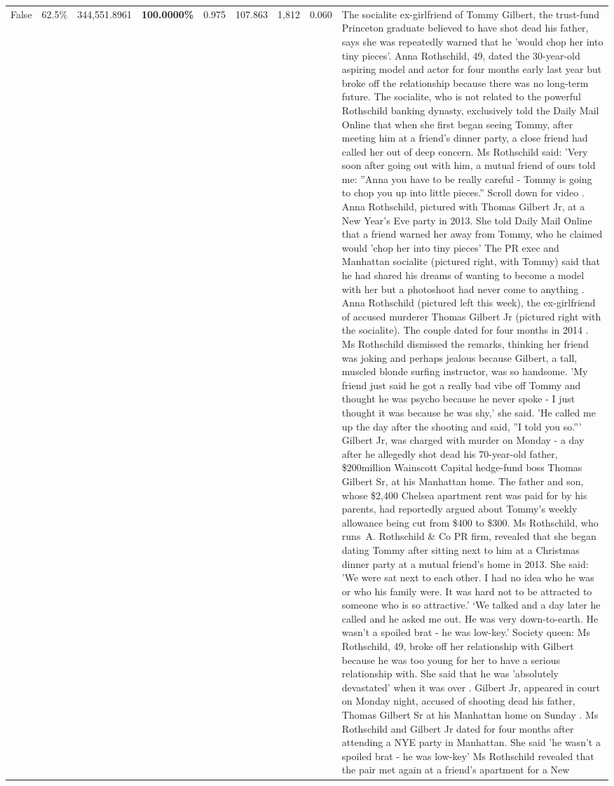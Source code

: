 \begin{table}[H]
\begin{tabular}{lllrlllll}
False & 62.5\% & 344,551.8961 & \bfseries \color{red} 100.0000\% & 0.975 & 107.863 & 1,812 & 0.060 & The socialite ex-girlfriend of Tommy Gilbert, the trust-fund Princeton graduate believed to have shot dead his father, says she was repeatedly warned that he 'would chop her into tiny pieces'. Anna Rothschild, 49, dated the 30-year-old aspiring model and actor for four months early last year but broke off the relationship because there was no long-term future. The socialite, who is not related to the powerful Rothschild banking dynasty, exclusively told the Daily Mail Online that when she first began seeing Tommy, after meeting him at a friend's dinner party, a close friend had called her out of deep concern. Ms Rothschild said: 'Very soon after going out with him, a mutual friend of ours told me: ''Anna you have to be really careful - Tommy is going to chop you up into little pieces.'' Scroll down for video . Anna Rothschild, pictured with Thomas Gilbert Jr, at a New Year's Eve party in 2013. She told Daily Mail Online that a friend warned her away from Tommy, who he claimed would 'chop her into tiny pieces' The PR exec and Manhattan socialite (pictured right, with Tommy) said that he had shared his dreams of wanting to become a model with her but a photoshoot had never come to anything . Anna Rothschild (pictured left this week), the ex-girlfriend of accused murderer Thomas Gilbert Jr (pictured right with the socialite). The couple dated for four months in 2014 . Ms Rothschild dismissed the remarks, thinking her friend was joking and perhaps jealous because Gilbert, a tall, muscled blonde surfing instructor, was so handsome. 'My friend just said he got a really bad vibe off Tommy and thought he was psycho because he never spoke - I just thought it was because he was shy,' she said. 'He called me up the day after the shooting and said, ''I told you so.''' Gilbert Jr, was charged with murder on Monday - a day after he allegedly shot dead his 70-year-old father, \$200million Wainscott Capital hedge-fund boss Thomas Gilbert Sr, at his Manhattan home. The father and son, whose \$2,400 Chelsea apartment rent was paid for by his parents, had reportedly argued about Tommy's weekly allowance being cut from \$400 to \$300. Ms Rothschild, who runs A. Rothschild \& Co PR firm, revealed that she began dating Tommy after sitting next to him at a Christmas dinner party at a mutual friend's home in 2013. She said: 'We were sat next to each other. I had no idea who he was or who his family were. It was hard not to be attracted to someone who is so attractive.' ‘We talked and a day later he called and he asked me out. He was very down-to-earth. He wasn’t a spoiled brat - he was low-key.’ Society queen: Ms Rothschild, 49, broke off her relationship with Gilbert because he was too young for her to have a serious relationship with. She said that he was 'absolutely devastated' when it was over . Gilbert Jr, appeared in court on Monday night, accused of shooting dead his father, Thomas Gilbert Sr at his Manhattan home on Sunday . Ms Rothschild and Gilbert Jr dated for four months after attending a NYE party in Manhattan. She said 'he wasn't a spoiled brat - he was low-key' Ms Rothschild revealed that the pair met again at a friend’s apartment for a New 
\end{tabular}
\end{table}
